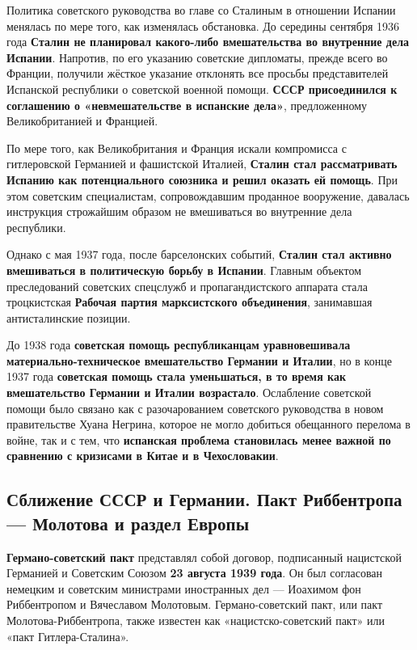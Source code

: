 \documentclass{article}
\begin{document}
\hfill

Политика советского руководства во главе со Сталиным в отношении Испании менялась по мере того, как изменялась обстановка. До середины сентября 1936 года \textbf{Сталин не планировал какого-либо вмешательства во внутренние дела Испании}. Напротив, по его указанию советские дипломаты, прежде всего во Франции, получили жёсткое указание отклонять все просьбы представителей Испанской республики о советской военной помощи. \textbf{СССР присоединился к соглашению о «невмешательстве в испанские дела»}, предложенному Великобританией и Францией.

\hfill

По мере того, как Великобритания и Франция искали компромисса с гитлеровской Германией и фашистской Италией, \textbf{Сталин стал рассматривать Испанию как потенциального союзника и решил оказать ей помощь}. При этом советским специалистам, сопровождавшим проданное вооружение, давалась инструкция строжайшим образом не вмешиваться во внутренние дела республики.

\hfill

Однако с мая 1937 года, после барселонских событий, \textbf{Сталин стал активно вмешиваться в политическую борьбу в Испании}. Главным объектом преследований советских спецслужб и пропагандистского аппарата стала троцкистская \textbf{Рабочая партия марксистского объединения}, занимавшая антисталинские позиции.

\hfill

До 1938 года \textbf{советская помощь республиканцам уравновешивала материально-техническое вмешательство Германии и Италии}, но в конце 1937 года \textbf{советская помощь стала уменьшаться, в то время как вмешательство Германии и Италии возрастало}. Ослабление советской помощи было связано как с разочарованием советского руководства в новом правительстве Хуана Негрина, которое не могло добиться обещанного перелома в войне, так и с тем, что \textbf{испанская проблема становилась менее важной по сравнению с кризисами в Китае и в Чехословакии}.

\pagebreak
\subsection{Сближение СССР и Германии. Пакт Риббентропа — Молотова и раздел Европы}

\textbf{Германо-советский пакт} представлял собой договор, подписанный нацистской Германией и Советским Союзом \textbf{23 августа 1939 года}. Он был согласован немецким и советским министрами иностранных дел — Иоахимом фон Риббентропом и Вячеславом Молотовым. Германо-советский пакт, или пакт Молотова-Риббентропа, также известен как «нацистско-советский пакт» или «пакт Гитлера-Сталина».
\end{document}
